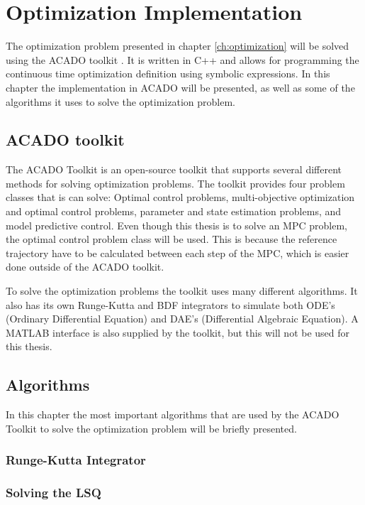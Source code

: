 \chapter{Optimization Implementation}

The optimization problem presented in chapter \ref{ch:optimization} will be solved using the ACADO toolkit \cite{acadoHOUSKA}. It is written in C++ and allows for programming the continuous time optimization definition using symbolic expressions. In this chapter the implementation in ACADO will be presented, as well as some of the algorithms it uses to solve the optimization problem.


\section{ACADO toolkit}

The ACADO Toolkit is an open-source toolkit that supports several different methods for solving optimization problems. The toolkit provides four problem classes that is can solve: Optimal control problems, multi-objective optimization and optimal control problems, parameter and state estimation problems, and model predictive control. Even though this thesis is to solve an MPC problem, the optimal control problem class will be used. This is because the reference trajectory have to be calculated between each step of the MPC, which is easier done outside of the ACADO toolkit.

To solve the optimization problems the toolkit uses many different algorithms. It also has its own Runge-Kutta and BDF integrators to simulate both ODE's (Ordinary Differential Equation) and DAE's (Differential Algebraic Equation). A MATLAB interface is also supplied by the toolkit, but this will not be used for this thesis.


\section{Algorithms}

In this chapter the most important algorithms that are used by the ACADO Toolkit to solve the optimization problem will be briefly presented.


\subsection{Runge-Kutta Integrator}


\subsection{Solving the LSQ}
